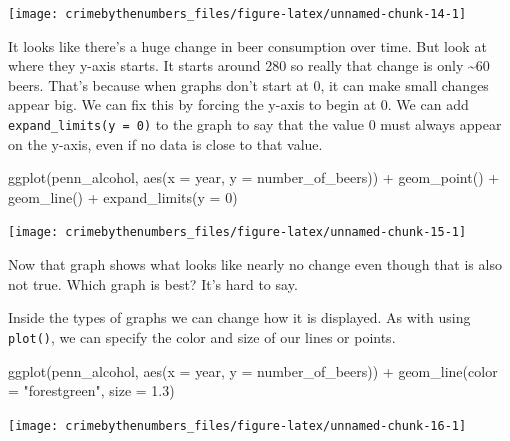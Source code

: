 \documentclass[
  12pt,
]{book}
\newenvironment{Shaded}{\begin{snugshade}}{\end{snugshade}}
\newcommand{\AttributeTok}[1]{\textcolor[rgb]{0.61,0.61,0.61}{#1}}
\newcommand{\DecValTok}[1]{\textcolor[rgb]{0.06,0.06,0.06}{#1}}
\newcommand{\FloatTok}[1]{\textcolor[rgb]{0.06,0.06,0.06}{#1}}
\newcommand{\FunctionTok}[1]{\textcolor[rgb]{0,0,0}{#1}}
\newcommand{\NormalTok}[1]{#1}
\newcommand{\SpecialCharTok}[1]{\textcolor[rgb]{0,0,0}{#1}}
\newcommand{\StringTok}[1]{\textcolor[rgb]{0.5,0.5,0.5}{#1}}
\begin{document}
\begin{center}\texttt{[image: crimebythenumbers\_files/figure-latex/unnamed-chunk-14-1]} \end{center}

It looks like there's a huge change in beer consumption over time. But look at where they y-axis starts. It starts around 280 so really that change is only \textasciitilde60 beers. That's because when graphs don't start at 0, it can make small changes appear big. We can fix this by forcing the y-axis to begin at 0. We can add \texttt{expand\_limits(y\ =\ 0)} to the graph to say that the value 0 must always appear on the y-axis, even if no data is close to that value.

\begin{Shaded}
\begin{Highlighting}[]
\FunctionTok{ggplot}\NormalTok{(penn\_alcohol, }\FunctionTok{aes}\NormalTok{(}\AttributeTok{x =}\NormalTok{ year, }\AttributeTok{y =}\NormalTok{ number\_of\_beers)) }\SpecialCharTok{+}
  \FunctionTok{geom\_point}\NormalTok{() }\SpecialCharTok{+}
  \FunctionTok{geom\_line}\NormalTok{() }\SpecialCharTok{+}
  \FunctionTok{expand\_limits}\NormalTok{(}\AttributeTok{y =} \DecValTok{0}\NormalTok{)}
\end{Highlighting}
\end{Shaded}

\begin{center}\texttt{[image: crimebythenumbers\_files/figure-latex/unnamed-chunk-15-1]} \end{center}

Now that graph shows what looks like nearly no change even though that is also not true. Which graph is best? It's hard to say.

Inside the types of graphs we can change how it is displayed. As with using \texttt{plot()}, we can specify the color and size of our lines or points.

\begin{Shaded}
\begin{Highlighting}[]
\FunctionTok{ggplot}\NormalTok{(penn\_alcohol, }\FunctionTok{aes}\NormalTok{(}\AttributeTok{x =}\NormalTok{ year, }\AttributeTok{y =}\NormalTok{ number\_of\_beers)) }\SpecialCharTok{+}
  \FunctionTok{geom\_line}\NormalTok{(}\AttributeTok{color =} \StringTok{"forestgreen"}\NormalTok{, }\AttributeTok{size =} \FloatTok{1.3}\NormalTok{)}
\end{Highlighting}
\end{Shaded}

\begin{center}\texttt{[image: crimebythenumbers\_files/figure-latex/unnamed-chunk-16-1]} \end{center}
\end{document}
